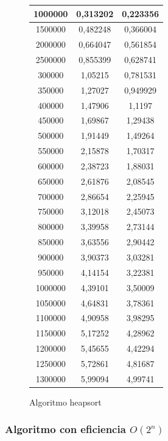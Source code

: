 \documentclass[12pt,spanish]{article}
\begin{document}
\begin{figure}[H]
\begin{tabular}{|c|c|c|}
\hline
1000000 & 0,313202 & 0,223356 \\
\hline
1500000 & 0,482248 & 0,366004\\
\hline
2000000 & 0,664047 & 0,561854\\
\hline
2500000 & 0,855399 & 0,628741\\
\hline
300000 & 1,05215 & 0,781531\\
\hline
350000 & 1,27027 & 0,949929\\
\hline
400000 & 1,47906 & 1,1197\\
\hline
450000 & 1,69867 & 1,29438\\
\hline
500000 & 1,91449 & 1,49264\\
\hline
550000 & 2,15878 & 1,70317\\
\hline
600000 & 2,38723 & 1,88031\\
\hline
650000 & 2,61876 & 2,08545\\
\hline
700000 & 2,86654 & 2,25945\\
\hline
750000 & 3,12018 & 2,45073\\
\hline
800000 & 3,39958 & 2,73144\\
\hline
850000 & 3,63556 & 2,90442\\
\hline
900000 & 3,90373 & 3,03281\\
\hline
950000 & 4,14154 & 3,22381\\
\hline
1000000 & 4,39101 & 3,50009\\
\hline
1050000 & 4,64831 & 3,78361\\
\hline
1100000 & 4,90958 & 3,98295\\
\hline
1150000 & 5,17252 & 4,28962\\
\hline
1200000 & 5,45655 & 4,42294\\
\hline
1250000 & 5,72861 & 4,81687\\
\hline
1300000 & 5,99094 & 4,99741\\
\hline
\end{tabular}
\caption{Algoritmo heapsort}
\end{figure}

\subsubsection{Algoritmo con eficiencia $O(2^n)$}
\end{document}
